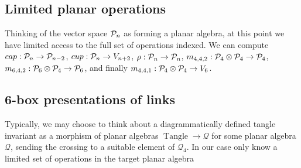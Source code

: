 \documentclass[12pt]{amsart}
\begin{document}

\subsection{Limited planar operations}
Thinking of the vector space $\mathcal{P}_n$ as forming a planar algebra, 
at this point we have limited access to the full set of operations indexed. We can compute
$cap : \mathcal{P}_n \to \mathcal{P}_{n-2}$, 
$cup : \mathcal{P}_n \to V_{n+2}$, 
$\rho: \mathcal{P}_n \to \mathcal{P}_n$, 
$m_{4,4,2} : \mathcal{P}_4 \otimes \mathcal{P}_4 \to \mathcal{P}_4$,
$m_{6,4,2} : \mathcal{P}_6 \otimes \mathcal{P}_4 \to \mathcal{P}_6$, 
and finally $m_{4,4,1} : \mathcal{P}_4 \otimes \mathcal{P}_4 \to V_6$.



\subsection{6-box presentations of links}
Typically, we may choose to think about a diagrammatically defined tangle invariant as a 
morphism of planar algebras $\operatorname{Tangle} \to \mathcal{Q}$ for some planar algebra 
$\mathcal{Q}$,
sending the crossing to a suitable element of $\mathcal{Q}_4$. In our case only know a 
limited set of operations in the target planar algebra
\end{document}
